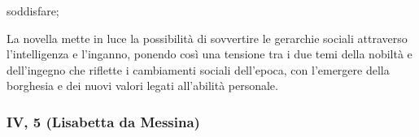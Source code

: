 \documentclass{article}
\begin{document}
\begin{enumerate}
\begin{subenumerate}
\begin{subenumerate}
                        soddisfare;
                \end{subenumerate}
            \item La novella mette in luce la possibilità di sovvertire le gerarchie sociali
                attraverso l'intelligenza e l'inganno, ponendo così una tensione tra i due
                temi della nobiltà e dell'ingegno che riflette i cambiamenti sociali
                dell'epoca, con l'emergere della borghesia e dei nuovi valori legati
                all'abilità personale.
        \end{subenumerate}
\end{enumerate}

\newpage
\subsubsection{IV, 5 (Lisabetta da Messina)}
\end{document}
